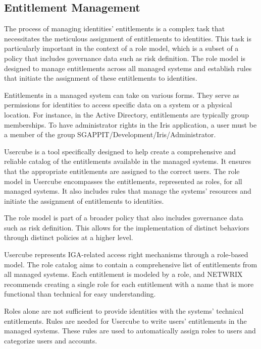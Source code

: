 \subsection{Entitlement Management}
\label{sec:Template}

The process of managing identities’ entitlements is a complex task that necessitates the meticulous assignment of entitlements to identities. This task is particularly important in the context of a role model, which is a subset of a policy that includes governance data such as risk definition. The role model is designed to manage entitlements across all managed systems and establish rules that initiate the assignment of these entitlements to identities.

Entitlements in a managed system can take on various forms. They serve as permissions for identities to access specific data on a system or a physical location. For instance, in the Active Directory, entitlements are typically group memberships. To have administrator rights in the Iris application, a user must be a member of the group SGAPPIT/Development/Iris/Administrator.

Usercube is a tool specifically designed to help create a comprehensive and reliable catalog of the entitlements available in the managed systems. It ensures that the appropriate entitlements are assigned to the correct users. The role model in Usercube encompasses the entitlements, represented as roles, for all managed systems. It also includes rules that manage the systems’ resources and initiate the assignment of entitlements to identities.

The role model is part of a broader policy that also includes governance data such as risk definition. This allows for the implementation of distinct behaviors through distinct policies at a higher level.

Usercube represents IGA-related access right mechanisms through a role-based model. The role catalog aims to contain a comprehensive list of entitlements from all managed systems. Each entitlement is modeled by a role, and NETWRIX recommends creating a single role for each entitlement with a name that is more functional than technical for easy understanding.

Roles alone are not sufficient to provide identities with the systems’ technical entitlements. Rules are needed for Usercube to write users’ entitlements in the managed systems. These rules are used to automatically assign roles to users and categorize users and accounts.

